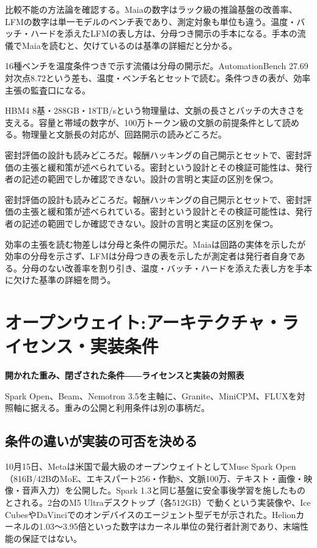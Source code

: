 \documentclass[lualatex,a4paper,10pt]{jlreq}
\begin{document}
比較不能の方法論を確認する。Maiaの数字はラック級の推論基盤の改善率、LFMの数字は単一モデルのベンチ表であり、測定対象も単位も違う。温度・バッチ・ハードを添えたLFMの表し方は、分母つき開示の手本になる。手本の流儀でMaiaを読むと、欠けているのは基準の詳細だと分かる。
\cite{B09,B66,B10,B67,B68,B11,B69,B12}


16種ベンチを温度条件つきで示す流儀は分母の開示だ。AutomationBench 27.69対次点8.72という差も、温度・ベンチ名とセットで読む。条件つきの表が、効率主張の監査口になる。
\cite{B11,B69,B12}


HBM4 8基・288GB・18TB/sという物理量は、文脈の長さとバッチの大きさを支える。容量と帯域の数字が、100万トークン級の文脈の前提条件として読める。物理量と文脈長の対応が、回路開示の読みどころだ。
\cite{B09,B66,B10,B67,B68}


密封評価の設計も読みどころだ。報酬ハッキングの自己開示とセットで、密封評価の主張と緩和策が述べられている。密封という設計とその検証可能性は、発行者の記述の範囲でしか確認できない。設計の言明と実証の区別を保つ。
\cite{B11,B69,B12}


密封評価の設計も読みどころだ。報酬ハッキングの自己開示とセットで、密封評価の主張と緩和策が述べられている。密封という設計とその検証可能性は、発行者の記述の範囲でしか確認できない。設計の言明と実証の区別を保つ。
\cite{B11,B69,B12}


効率の主張を読む物差しは分母と条件の開示だ。Maiaは回路の実体を示したが効率の分母を示さず、LFMは分母つきの表を示したが測定者は発行者自身である。分母のない改善率を割り引き、温度・バッチ・ハードを添えた表し方を手本に欠けた基準の詳細を問う。
\cite{B09,B66,B10,B67,B68,B11,B69,B12}


\section{オープンウェイト:アーキテクチャ・ライセンス・実装条件}
\label{sec:P3}

{\Large\bfseries 開かれた重み、閉ざされた条件――ライセンスと実装の対照表\par}
\smallskip
{\color{SurveyMuted}Spark Open、Beam、Nemotron 3.5を主軸に、Granite、MiniCPM、FLUXを対照軸に据える。重みの公開と利用条件は別の事柄だ。\par}
\bigskip

\subsection*{条件の違いが実装の可否を決める}

10月15日、Metaは米国で最大級のオープンウェイトとしてMuse Spark Open（816B/42BのMoE、エキスパート256・作動8、文脈100万、テキスト・画像・映像・音声入力）を公開した。Spark 1.3と同じ基盤に安全事後学習を施したものとされる。2台のM5 Ultraデスクトップ（各512GB）で動くという実装像や、Ice CubesやDaVinciでのオンデバイスのエージェント型デモが示された。Helionカーネルの1.03〜3.95倍といった数字はカーネル単位の発行者計測であり、末端性能の保証ではない。
\cite{B14,B70,B15,B13,B71}
\end{document}
